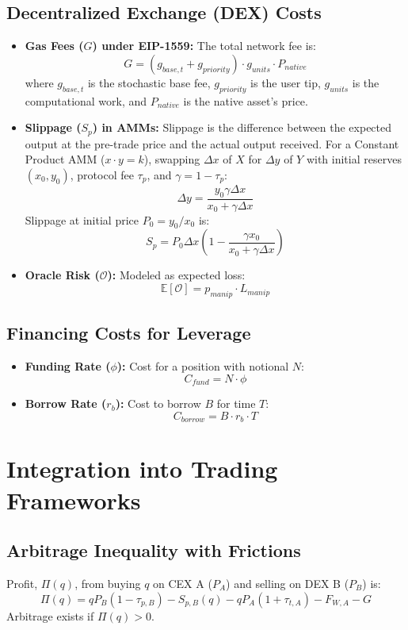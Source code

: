 \documentclass{article}
\begin{document}
\subsection{Decentralized Exchange (DEX) Costs}
\begin{itemize}
    \item \textbf{Gas Fees ($G$) under EIP-1559:} The total network fee is:
    $$G = (g_{base, t} + g_{priority}) \cdot g_{units} \cdot P_{native}$$
    where $g_{base, t}$ is the stochastic base fee, $g_{priority}$ is the user tip, $g_{units}$ is the computational work, and $P_{native}$ is the native asset's price.

    \item \textbf{Slippage ($S_p$) in AMMs:}  Slippage is the difference between the expected output at the pre-trade price and the actual output received.  For a Constant Product AMM ($x \cdot y = k$), swapping $\Delta x$ of $X$ for $\Delta y$ of $Y$ with initial reserves $(x_0, y_0)$, protocol fee $\tau_p$, and $\gamma = 1 - \tau_p$:
    $$ \Delta y = \frac{y_0 \gamma \Delta x}{x_0 + \gamma \Delta x} $$
    Slippage at initial price $P_0 = y_0/x_0$ is:
    $$ S_p = P_0 \Delta x \left(1 - \frac{\gamma x_0}{x_0 + \gamma \Delta x}\right) $$

    \item \textbf{Oracle Risk ($\mathcal{O}$):} Modeled as expected loss:
    $$\mathbb{E}[\mathcal{O}] = p_{manip} \cdot L_{manip}$$
\end{itemize}

\subsection{Financing Costs for Leverage}
\begin{itemize}
    \item \textbf{Funding Rate ($\phi$):} Cost for a position with notional $N$:
    $$C_{fund} = N \cdot \phi$$

    \item \textbf{Borrow Rate ($r_b$):} Cost to borrow $B$ for time $T$:
    $$C_{borrow} = B \cdot r_b \cdot T$$
\end{itemize}

\section{Integration into Trading Frameworks}

\subsection{Arbitrage Inequality with Frictions}
Profit, $\Pi(q)$, from buying $q$ on CEX A ($P_A$) and selling on DEX B ($P_B$) is:
$$ \Pi(q) = q P_B(1 - \tau_{p,B}) - S_{p,B}(q) - q P_A(1 + \tau_{t,A}) - F_{W,A} - G $$
Arbitrage exists if $\Pi(q) > 0$.
\end{document}
